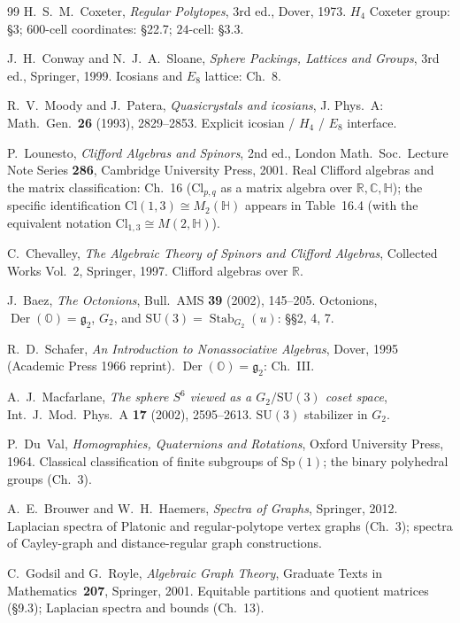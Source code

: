 \documentclass[11pt, a4paper]{amsart}
\theoremstyle{definition}
\newcommand{\R}{\mathbb{R}}
\newcommand{\C}{\mathbb{C}}
\newcommand{\HH}{\mathbb{H}}
\newcommand{\OO}{\mathbb{O}}
\newcommand{\Der}{\operatorname{Der}}
\newcommand{\Stab}{\operatorname{Stab}}
\newcommand{\Cl}{\mathrm{Cl}}
\newcommand{\Sp}{\mathrm{Sp}}
\newcommand{\SU}{\mathrm{SU}}
\begin{document}
\begin{thebibliography}{99}
H.~S.~M.~Coxeter, \emph{Regular Polytopes}, 3rd ed., Dover, 1973.
$H_4$ Coxeter group: \S 3; $600$-cell coordinates: \S 22.7;
$24$-cell: \S 3.3.

J.~H.~Conway and N.~J.~A.~Sloane, \emph{Sphere Packings, Lattices
and Groups}, 3rd ed., Springer, 1999. Icosians and $E_8$ lattice:
Ch.~8.

R.~V.~Moody and J.~Patera, \emph{Quasicrystals and icosians}, J.
Phys.\ A: Math.\ Gen.\ \textbf{26} (1993), 2829--2853. Explicit
icosian / $H_4$ / $E_8$ interface.

P.~Lounesto, \emph{Clifford Algebras and Spinors}, 2nd ed., London
Math.\ Soc.\ Lecture Note Series \textbf{286}, Cambridge
University Press, 2001. Real Clifford algebras and the matrix
classification: Ch.~16 ($\Cl_{p,q}$ as a matrix algebra over
$\R, \C, \HH$); the specific identification $\Cl(1,3) \cong
M_2(\HH)$ appears in Table~16.4 (with the equivalent notation
$\mathrm{Cl}_{1,3} \cong M(2, \HH)$).

C.~Chevalley, \emph{The Algebraic Theory of Spinors and Clifford
Algebras}, Collected Works Vol.~2, Springer, 1997. Clifford
algebras over $\R$.

J.~Baez, \emph{The Octonions}, Bull.\ AMS \textbf{39} (2002),
145--205. Octonions, $\Der(\OO) = \mathfrak{g}_2$, $G_2$, and
$\SU(3) = \Stab_{G_2}(u)$: \S\S 2, 4, 7.

R.~D.~Schafer, \emph{An Introduction to Nonassociative Algebras},
Dover, 1995 (Academic Press 1966 reprint). $\Der(\OO) =
\mathfrak{g}_2$: Ch.~III.

A.~J.~Macfarlane, \emph{The sphere $S^6$ viewed as a $G_2/\SU(3)$
coset space}, Int.\ J.\ Mod.\ Phys.\ A \textbf{17} (2002),
2595--2613. $\SU(3)$ stabilizer in $G_2$.

P.~Du~Val, \emph{Homographies, Quaternions and Rotations}, Oxford
University Press, 1964. Classical classification of finite
subgroups of $\Sp(1)$; the binary polyhedral groups (Ch.~3).

A.~E.~Brouwer and W.~H.~Haemers, \emph{Spectra of Graphs},
Springer, 2012. Laplacian spectra of Platonic and regular-polytope
vertex graphs (Ch.~3); spectra of Cayley-graph and
distance-regular graph constructions.

C.~Godsil and G.~Royle, \emph{Algebraic Graph Theory}, Graduate
Texts in Mathematics~\textbf{207}, Springer, 2001. Equitable
partitions and quotient matrices (\S 9.3); Laplacian spectra and
bounds (Ch.~13).


\end{thebibliography}
\end{document}

